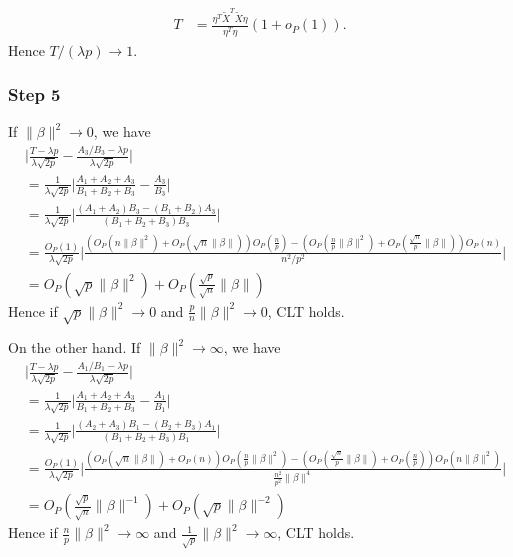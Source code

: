 \documentclass[review]{elsarticle}
\theoremstyle{plain}
\theoremstyle{definition}
\theoremstyle{remark}
\begin{document}
\begin{equation}
    \begin{aligned}
        T&=
        \frac{\eta^T \tilde{X}^T\tilde{X} \eta    
        }{\eta^T\eta}(1+o_P(1)).
    \end{aligned}
\end{equation}
Hence $T/(\lambda p)\to 1$.


\subsubsection{Step 5}




If $\|\beta\|^2\to 0$, we have
\begin{equation}
    \begin{aligned}
        &\Big|\frac{T-{\lambda p}}{\lambda\sqrt{2p}
        }-
    \frac{A_3/B_3-{\lambda p}}{\lambda\sqrt{2p}
        }\Big|\\
        &=
        \frac{1}{\lambda\sqrt{2p}}
        \Big|
        \frac{A_1+A_2+A_3}{B_1+B_2+B_3}-\frac{A_3}{B_3}
        \Big|\\
        &=
        \frac{1}{\lambda\sqrt{2p}}
        \Big|
        \frac{(A_1+A_2)B_3-(B_1+B_2)A_3}{(B_1+B_2+B_3)B_3}
        \Big|\\
        &=
        \frac{O_{P}(1)}{\lambda\sqrt{2p}}
        \Big|
        \frac{(O_P(n\|\beta\|^2)+O_P(\sqrt{n}\|\beta\|))O_P(\frac{n}{p})-(O_P(\frac{n}{p}\|\beta\|^2)+O_P(\frac{\sqrt{n}}{p}\|\beta\|))O_P(n)}{n^2/p^2}
        \Big|\\
        &=O_P(\sqrt{p}\|\beta\|^2)+O_P(\frac{\sqrt{p}}{\sqrt{n}}\|\beta\|)
    \end{aligned}
\end{equation}
Hence if $\sqrt{p}\|\beta\|^2\to 0$ and $\frac{p}{n}\|\beta\|^2\to 0$, CLT holds.

On the other hand. If $\|\beta\|^2\to \infty$, we have
\begin{equation}
    \begin{aligned}
        &\Big|\frac{T-{\lambda p}}{\lambda\sqrt{2p}
        }-
    \frac{{A_1}/{B_1}-{\lambda p}}{\lambda\sqrt{2p}
        }\Big|\\
        &=
        \frac{1}{\lambda\sqrt{2p}}
        \Big|
        \frac{A_1+A_2+A_3}{B_1+B_2+B_3}-\frac{A_1}{B_1}
        \Big|\\
        &=
        \frac{1}{\lambda\sqrt{2p}}
        \Big|
        \frac{(A_2+A_3)B_1-(B_2+B_3)A_1}{(B_1+B_2+B_3)B_1}
        \Big|\\
        &=
        \frac{O_{P}(1)}{\lambda\sqrt{2p}}
        \Big|
        \frac{(O_P(\sqrt{n}\|\beta\|)+O_P(n))O_P(\frac{n}{p}\|\beta\|^2)-(O_P(\frac{\sqrt{n}}{p}\|\beta\|)+O_P(\frac{n}{p}))O_P(n\|\beta\|^2)}{\frac{n^2}{p^2}\|\beta\|^4}
        \Big|\\
        &=O_P(\frac{\sqrt{p}}{\sqrt{n}}\|\beta\|^{-1})+O_P(\sqrt{p}\|\beta\|^{-2})
    \end{aligned}
\end{equation}
Hence if $\frac{n}{p}\|\beta\|^2\to \infty$ and $\frac{1}{\sqrt{p}}\|\beta\|^2\to \infty$, CLT holds.
\end{document}
